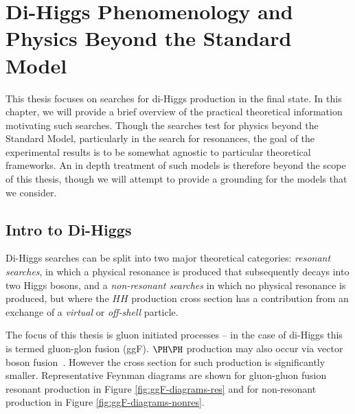 \chapter{Di-Higgs Phenomenology and Physics Beyond the Standard Model}
\label{chap:hh-bsm}
This thesis focuses on searches for di-Higgs production in the \bbbb final state. In this chapter,
we will provide a brief overview of the practical theoretical information motivating such searches. 
Though the searches test for physics beyond the Standard Model, particularly in the search for 
resonances, the goal of the experimental results is to be somewhat agnostic to particular 
theoretical frameworks. An in depth treatment of such models is therefore beyond the scope 
of this thesis, though we will attempt to provide a grounding for the models that we consider.

\section{Intro to Di-Higgs}
Di-Higgs searches can be split into two major theoretical categories: \emph{resonant searches}, in which a physical resonance is produced that subsequently decays into two Higgs bosons, and a \emph{non-resonant searches} in which no physical resonance is produced, but where the $HH$ production cross section has a contribution from an exchange of a \emph{virtual} or \emph{off-shell} particle. 

The focus of this thesis is gluon initiated processes -- in the case of di-Higgs this is termed gluon-glon fusion
(ggF). $\higgs\higgs$ production may also occur via vector boson fusion~\cite{HDBS-2018-18}. However the cross section for such production is significantly smaller. Representative Feynman diagrams are shown for gluon-gluon fusion 
resonant production in Figure \ref{fig:ggF-diagrams-res} and for non-resonant production in 
Figure \ref{fig:ggF-diagrams-nonres}.

